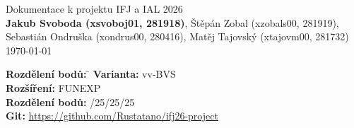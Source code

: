 \begin{center}
    \Huge Dokumentace k projektu IFJ a IAL 2026 \\
    \vspace{1em}
    \large \textbf{Jakub Svoboda (xsvoboj01, 281918)}, Štěpán Zobal (xzobals00, 281919),
    Sebastián Ondruška (xondrus00, 280416), Matěj Tajovský (xtajovm00, 281732) \\
    \vspace{1em}
    \today
\end{center}

\begin{tabbing}
    \textbf{Rozdělení bodů:} \quad \=  \kill
    \textbf{Varianta:} \> vv-BVS \\
    \textbf{Rozšíření:} \> FUNEXP \\
    \textbf{Rozdělení bodů:} /25/25/25 \\
    \textbf{Git:} \> \href{https://github.com/Rustatano/ifj26-project}{https://github.com/Rustatano/ifj26-project}
\end{tabbing}

